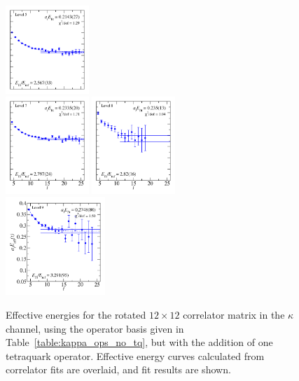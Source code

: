 \begin{figure}
  \includegraphics[width=0.28\textwidth]{figures/spectrum_a1g/with_tq/fits/fit_5.pdf}\\
  \includegraphics[width=0.28\textwidth]{figures/spectrum_a1g/with_tq/fits/fit_6.pdf}
  \includegraphics[width=0.28\textwidth]{figures/spectrum_a1g/with_tq/fits/fit_7.pdf}\\[-0.4cm]
  \includegraphics[width=0.336\textwidth]{figures/spectrum_a1g/with_tq/fits/fit_9.pdf}
  \caption{Effective energies for the rotated $12\times 12$ correlator matrix in the $\kappa$ channel, using the operator basis given in Table~\ref{table:kappa_ops_no_tq}, but with the addition of one tetraquark operator. Effective energy curves calculated from correlator fits are overlaid, and fit results are shown.}
  \label{fig:kappa_with_tq_grid}
\end{figure}

